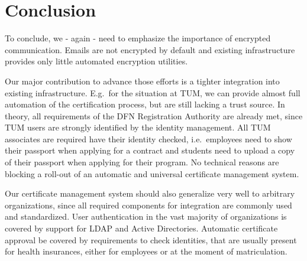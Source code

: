 \begin{abstract}
    
\end{abstract}

\begin{otherlanguage}{ngerman}
    \begin{abstract}
        
    \end{abstract}
\end{otherlanguage}

\setcounter{tocdepth}{1}
\tableofcontents
\listoffigures

\startcontent













\chapter{Conclusion}\label{ch:conclusion}
To conclude, we - again - need to emphasize the importance of encrypted communication.
Emails are not encrypted by default and existing infrastructure provides only little automated encryption utilities.

Our major contribution to advance those efforts is a tighter integration into existing infrastructure.
E.g.\ for the situation at TUM, we can provide almost full automation of the certification process, but are still
lacking a trust source.
In theory, all requirements of the DFN Registration Authority are already met, since TUM users are strongly identified
by the identity management.
All TUM associates are required have their identity checked, i.e.\ employees need to show their passport when applying
for a contract and students need to upload a copy of their passport when applying for their program.
No technical reasons are blocking a roll-out of an automatic and universal certificate management system.

Our certificate management system should also generalize very well to arbitrary organizations, since all required
components for integration are commonly used and standardized.
User authentication in the vast majority of organizations is covered by support for LDAP and Active Directories.
Automatic certificate approval be covered by requirements to check identities, that are usually present for health
insurances, either for employees or at the moment of matriculation.

\pagestyle{thesischapter}
\cleardoublepage
{}
\printbibliography[heading=bibintoc]
